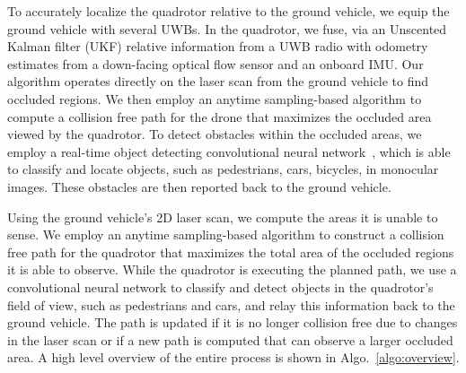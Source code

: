 
To accurately localize the quadrotor relative to the ground vehicle, we equip the ground vehicle with several UWBs. In the quadrotor, we fuse, via an Unscented Kalman filter (UKF) relative information from a UWB radio with odometry estimates from a down-facing optical flow sensor and an onboard IMU.
Our algorithm operates directly on the laser scan from the ground vehicle to find occluded
regions.
We then employ an anytime sampling-based algorithm to compute a collision free path for the drone
that maximizes the occluded area viewed by the quadrotor.
To detect obstacles within the occluded areas, we employ a real-time object
detecting convolutional neural network~\cite{redmon2016you}, which is able to
classify and locate objects, such as pedestrians, cars, bicycles, in monocular
images.  These obstacles are then reported back to the ground vehicle.

%
%

Using the ground vehicle's 2D laser scan, we compute the areas it is unable to
sense. We employ an anytime sampling-based algorithm to construct a collision free 
path for the quadrotor that maximizes the total area of the occluded
regions it is able to observe. While the quadrotor is executing the planned
path, we use a convolutional neural network to classify and detect objects in
the quadrotor's field of view, such as pedestrians and cars, and relay this
information back to the ground vehicle. The path is updated if it is no longer
collision free due to changes in the laser scan or if a new path is computed
that can observe a larger occluded area. A high level overview of the entire
process is shown in Algo.~\ref{algo:overview}.

